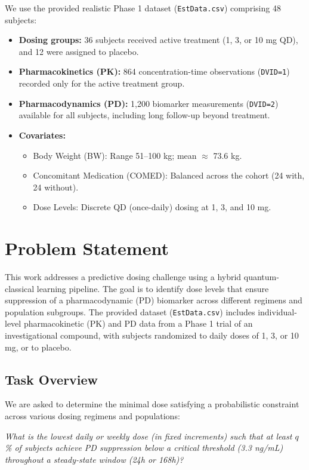 \documentclass[11pt]{article}
\begin{document}
We use the provided realistic Phase 1 dataset (\texttt{EstData.csv}) comprising 48 subjects:
\begin{itemize}[noitemsep]
  \item \textbf{Dosing groups:} 36 subjects received active treatment (1, 3, or 10 mg QD), and 12 were assigned to placebo.
  \item \textbf{Pharmacokinetics (PK):} 864 concentration-time observations (\texttt{DVID=1}) recorded only for the active treatment group.
  \item \textbf{Pharmacodynamics (PD):} 1,200 biomarker measurements (\texttt{DVID=2}) available for all subjects, including long follow-up beyond treatment.
  \item \textbf{Covariates:}
    \begin{itemize}
        \item Body Weight (BW): Range 51--100 kg; mean $\approx$ 73.6 kg.
        \item Concomitant Medication (COMED): Balanced across the cohort (24 with, 24 without).
        \item Dose Levels: Discrete QD (once-daily) dosing at 1, 3, and 10 mg.
    \end{itemize}
\end{itemize}

\section{Problem Statement}

This work addresses a predictive dosing challenge using a hybrid quantum-classical learning pipeline. The goal is to identify dose levels that ensure suppression of a pharmacodynamic (PD) biomarker across different regimens and population subgroups. The provided dataset (\texttt{EstData.csv}) includes individual-level pharmacokinetic (PK) and PD data from a Phase 1 trial of an investigational compound, with subjects randomized to daily doses of 1, 3, or 10 mg, or to placebo. 

\subsection{Task Overview}

We are asked to determine the minimal dose satisfying a probabilistic constraint across various dosing regimens and populations:
\vspace{0.5em}

\emph{What is the lowest daily or weekly dose (in fixed increments) such that at least \(q\)\% of subjects achieve PD suppression below a critical threshold (3.3 ng/mL) throughout a steady-state window (24h or 168h)?}
\end{document}
